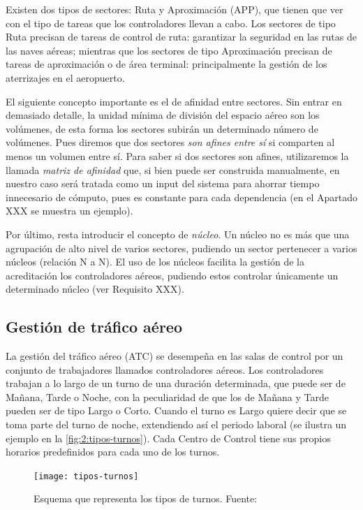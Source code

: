 Existen dos tipos de sectores: Ruta y Aproximación (APP), que tienen que ver con el tipo de tareas que los 
controladores llevan a cabo.
Los sectores de tipo Ruta precisan de tareas de control de ruta: garantizar la seguridad en las rutas de las naves aéreas; mientras que los sectores de tipo Aproximación precisan de tareas de aproximación o de área terminal: principalmente la gestión de los aterrizajes en el aeropuerto.

El siguiente concepto importante es el de afinidad entre sectores. Sin entrar en demasiado detalle, la unidad mínima de división del espacio aéreo son los volúmenes, de esta forma los sectores subirán un determinado número de volúmenes.
Pues diremos que dos sectores \textit{son afines entre sí} si comparten al menos un volumen entre sí. Para saber si dos sectores son afines, utilizaremos la llamada \textit{matriz de afinidad} que, si bien puede ser construida manualmente, en nuestro caso será tratada como un input del sistema para ahorrar tiempo innecesario de cómputo, pues es constante para cada dependencia (en el Apartado XXX se muestra un ejemplo). %

Por último, resta introducir el concepto de \textit{núcleo}. Un núcleo no es más que una agrupación de alto nivel de varios sectores, pudiendo un sector pertenecer a varios núcleos (relación N a N). El uso de los núcleos facilita la gestión de la acreditación los controladores aéreos, pudiendo estos controlar únicamente un determinado núcleo (ver Requisito XXX). %


\subsection{Gestión de tráfico aéreo}
La gestión del tráfico aéreo (\gls{ATC}) se desempeña en las salas de control por un conjunto de trabajadores 
llamados controladores aéreos. Los controladores trabajan a lo largo de un turno de una duración determinada, que puede ser de Mañana, Tarde o Noche, con la peculiaridad de que los de Mañana y Tarde pueden ser de tipo Largo o Corto. 
Cuando el turno es Largo quiere decir que se toma parte del turno de noche, extendiendo así el periodo laboral (se ilustra un ejemplo en la \autoref{fig:2:tipos-turnos}). Cada \acrlong{Centro de Control} tiene sus propios horarios predefinidos para cada uno de los turnos.

\begin{figure}
	\centering
	\texttt{[image: tipos-turnos]}
	\caption[Esquema que representa los tipos de turnos]{Esquema que representa los tipos de turnos. 
	Fuente:~\cite{articulo1}}
	\label{fig:2:tipos-turnos}
\end{figure}


